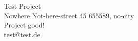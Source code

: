 \documentclass[12pt,a4paper]{article} %
\begin{document}
Test Project\\
Nowhere
Not-here-street 45
655589, no-city\\
Project good!\\
test@test.de\\
\end{document}
